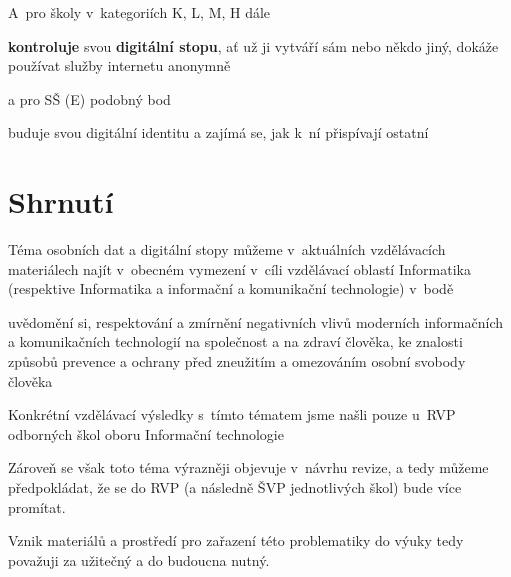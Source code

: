 A~pro školy v~kategoriích K, L, M, H dále

\begin{displayquote}
\textbf{kontroluje} svou \textbf{digitální stopu}, ať už ji vytváří sám nebo někdo jiný, dokáže používat služby internetu anonymně
\end{displayquote}

a pro SŠ (E) podobný bod

\begin{displayquote}
buduje svou digitální identitu a zajímá se, jak k~ní přispívají ostatní
\end{displayquote}

\section{Shrnutí}

Téma osobních dat a digitální stopy můžeme v~aktuálních vzdělávacích materiálech najít v~obecném vymezení v~cíli vzdělávací oblastí Informatika (respektive Informatika a informační a komunikační technologie) v~bodě

\begin{displayquote}
uvědomění si, respektování a zmírnění negativních vlivů moderních informačních a komunikačních technologií na společnost a na zdraví člověka, ke znalosti způsobů prevence a ochrany před zneužitím a omezováním osobní svobody člověka
\end{displayquote}

Konkrétní vzdělávací výsledky s~tímto tématem jsme našli pouze u~RVP odborných škol oboru Informační technologie

Zároveň se však toto téma výrazněji objevuje v~návrhu revize, a tedy můžeme předpokládat, že se do RVP (a následně ŠVP jednotlivých škol) bude více promítat.

Vznik materiálů a prostředí pro zařazení této problematiky do výuky tedy považuji za užitečný a do budoucna nutný.